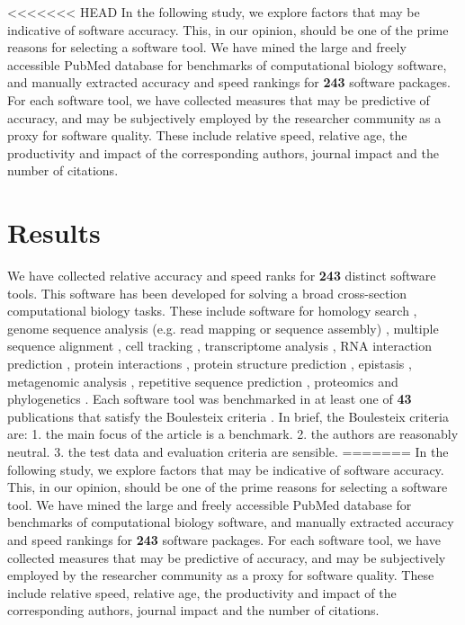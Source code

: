 \documentclass[fleqn,10pt]{SelfArx} %
\begin{document}
<<<<<<< HEAD
In the following study, we explore factors that may be indicative of software accuracy. This, in our opinion, should be one of the prime reasons for selecting a software tool. We have mined the large and freely accessible PubMed database \cite{Sayers2010-vm} for benchmarks of computational biology software, and manually extracted accuracy and speed rankings for \textbf{{\color{black}243}} software packages. For each software tool, we have collected measures that may be predictive of accuracy, and may be subjectively employed by the researcher community as a proxy for software quality. These include relative speed, relative age, the productivity and impact of the corresponding authors, journal impact and the number of citations. 

\section*{Results}
We have collected relative accuracy and speed ranks for \textbf{{\color{black}243}} distinct software tools. This software has been developed for solving a broad cross-section computational biology tasks. These include software for homology search \cite{Freyhult2007-et}, genome sequence analysis (e.g. read mapping or sequence assembly) \cite{Junemann2014-mb,Tran2014-pe,Zhang2011-nd,Abbas2014-gu,Bao2011-lv,Caboche2014-lj,Kleftogiannis2013-wi,Hatem2013-cs,Schbath2012-ob,Ruffalo2011-rl,Yang2013-aj,Holtgrewe2011-fd,Rackham2015-ag,Huang2015-wu}, multiple sequence alignment \cite{Thompson2011-rf,Nuin2006-nk,Pais2014-sr,Pervez2014-zp,Liu2010-rp}, cell tracking \cite{Maska2014-ak}, transcriptome analysis \cite{Li2012-wr,Lu2013-fs,Liu2014-kz,Kumar2016-xz}, RNA interaction prediction \cite{Pain2015-gr}, protein interactions \cite{Tikk2010-qd}, protein structure prediction \cite{Kolodny2005-ry,Wallner2005-qi}, epistasis \cite{Shang2011-vy},  metagenomic analysis \cite{Lindgreen2016-tt,Bazinet2012-wf}, repetitive sequence prediction \cite{Saha2008-kd}, proteomics \cite{Lange2008-pt,Yang2009-oc} and phylogenetics \cite{Liu2011-pz,Yang2011-dv,Oscamou2008-md,Bayzid2013-hc,Liu2009-lx}. Each software tool was benchmarked in at least one of \textbf{{\color{black}43}} publications that satisfy the Boulesteix criteria \cite{Boulesteix2013-vb}. In brief, the Boulesteix criteria are: 1. the main focus of the article is a benchmark. 2. the authors are reasonably neutral. 3. the test data and evaluation criteria are sensible.
=======
In the following study, we explore factors that may be indicative of software accuracy. This, in our opinion, should be one of the prime reasons for selecting a software tool. We have mined the large and freely accessible PubMed database \cite{Sayers2010-vm} for benchmarks of computational biology software, and manually extracted accuracy and speed rankings for \textbf{{\color{red}243}} software packages. For each software tool, we have collected measures that may be predictive of accuracy, and may be subjectively employed by the researcher community as a proxy for software quality. These include relative speed, relative age, the productivity and impact of the corresponding authors, journal impact and the number of citations. 
\end{document}
